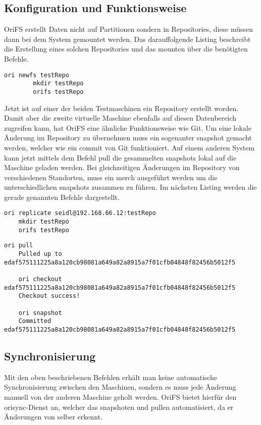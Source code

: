 \subsection{Konfiguration und Funktionsweise}
	OriFS erstellt Daten nicht auf Partitionen sondern in Repositories, diese müssen dann bei dem System gemountet werden. Das darauffolgende Listing beschreibt die Erstellung eines solchen Repositories und das mounten über die benötigten Befehle.
	\begin{lstlisting}[style=Java, caption=Konfiguration eines OriFS Repositories]
		ori newfs testRepo
		mkdir testRepo
		orifs testRepo
	\end{lstlisting}
	Jetzt ist auf einer der beiden Testmaschinen ein Repository erstellt worden. Damit aber die zweite virtuelle Maschine ebenfalls auf diesen Datenbereich zugreifen kann, hat OriFS eine ähnliche Funktionsweise wie Git. Um eine lokale Änderung im Repository zu übernehmen muss ein sogenanter snapshot gemacht werden, welcher wie ein commit von Git funktioniert. Auf einem anderen System kann jetzt mittels dem Befehl pull die gesammelten snapshots lokal auf die Maschine geladen werden. Bei gleichzeitigen Änderungen im Repository von verschiedenen Standorten, muss ein merch ausgeführt werden um die unterschiedlichen snapshots zusammen zu führen. Im nächsten Listing werden die gerade genannten Befehle dargestellt.
	\begin{lstlisting}[style=Java, caption=OriFS Befehle]
	ori replicate seidl@192.168.66.12:testRepo
	mkdir testRepo	
	orifs testRepo
	\end{lstlisting}	
	\begin{lstlisting}[style=Java, caption=OriFS Befehl pull und snapshot]
	ori pull
	Pulled up to edaf575111225a8a120cb98081a649a82a8915a7f01cfb04848f82456b5012f5
	
	ori checkout edaf575111225a8a120cb98081a649a82a8915a7f01cfb04848f82456b5012f5
	Checkout success!
	
	ori snapshot
	Committed edaf575111225a8a120cb98081a649a82a8915a7f01cfb04848f82456b5012f5
	\end{lstlisting}	

\subsection{Synchronisierung}
	Mit den oben beschriebenen Befehlen erhält man keine automatische Synchronisierung zwischen den Maschinen, sondern es muss jede Änderung manuell von der anderen Maschine geholt werden. OriFS bietet hierfür den orisync-Dienst an, welcher das snapshoten und pullen automatisiert, da er Änderungen von selber erkennt. \\
	
